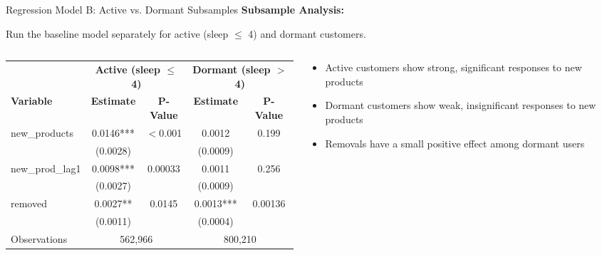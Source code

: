 \documentclass[aspectratio=169]{beamer}  %
\begin{document}
\begin{frame}{Regression Model B: Active vs. Dormant Subsamples}
\textbf{Subsample Analysis:}
    
Run the baseline model separately for active (sleep $\leq$ 4) and dormant customers.
\begin{columns}
\begin{column}{0.6\linewidth}
    

    \begin{table}[h]
    \centering
    \scriptsize
    \begin{tabular}{l c c c c}
    \toprule
     & \multicolumn{2}{c}{\textbf{Active (sleep $\leq$ 4)}} & \multicolumn{2}{c}{\textbf{Dormant (sleep $>$ 4)}} \\
    \cmidrule(lr){2-3} \cmidrule(lr){4-5}
    \textbf{Variable} & \textbf{Estimate} & \textbf{P-Value} & \textbf{Estimate} & \textbf{P-Value} \\
    \midrule
    	new\_products & 0.0146*** & $<$0.001 & 0.0012 & 0.199 \\
     & (0.0028) & & (0.0009) & \\
    	new\_prod\_lag1 & 0.0098*** & 0.00033 & 0.0011 & 0.256 \\
     & (0.0027) & & (0.0009) & \\
    	removed & 0.0027** & 0.0145 & 0.0013*** & 0.00136 \\
     & (0.0011) & & (0.0004) & \\
    \midrule
    Observations & \multicolumn{2}{c}{562,966} & \multicolumn{2}{c}{800,210} \\
    \bottomrule
    \end{tabular}
    \end{table}
\end{column}
\begin{column}{0.4\linewidth}    
    \begin{itemize}
        \item Active customers show strong, significant responses to new products
        \item Dormant customers show weak, insignificant responses to new products
        \item Removals have a small positive effect among dormant users
    \end{itemize}
\end{column}
\end{columns}
\end{frame}
\end{document}
